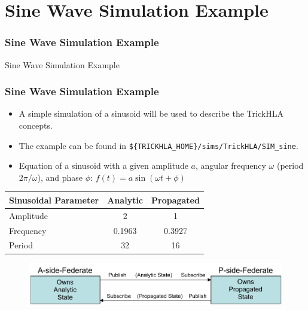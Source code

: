 \documentclass{beamer}
\begin{document}
   \section{Sine Wave Simulation Example}

   \begin{frame}
      \frametitle{Sine Wave Simulation Example}
      \begin{center}
      \Huge{Sine Wave Simulation Example}
      \end{center}
   \end{frame}
   
   \begin{frame}
      \frametitle{Sine Wave Simulation Example}
      \begin{itemize}
         \item A simple simulation of a sinusoid will be used to describe the TrickHLA concepts.
         \item The example can be found in \texttt{\$\{TRICKHLA\_HOME\}/sims/TrickHLA/SIM\_sine}.
         \item Equation of a sinusoid with a given amplitude $a$, angular frequency $\omega$ (period $2\pi/\omega$), and phase $\phi$: $f(t) = a \sin( \omega t + \phi )$
      \end{itemize}

      \begin{small}
      \begin{center}
      \begin{tabular}{ |l|c|c| } \hline
       \bf{Sinusoidal Parameter} & \bf{Analytic} & \bf{Propagated} \\ \hline
       Amplitude & 2 & 1 \\ \hline
       Frequency & 0.1963 & 0.3927 \\ \hline
       Period & 32 & 16 \\ \hline
      \end{tabular}
      \end{center}
      \end{small}

      \begin{center}
      \begin{figure}
      \includegraphics[scale=0.65]{TutorialFig1.pdf}
      \end{figure}
      \end{center}
      
   \end{frame}
   
\end{document}
